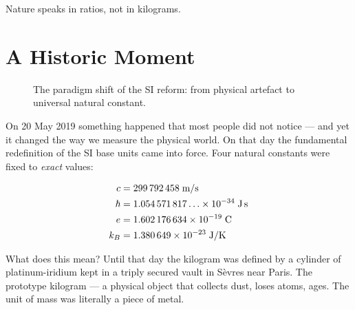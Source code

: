 \epigraph{Nature speaks in ratios, not in kilograms.}{}

\section{A Historic Moment}


\begin{figure}[ht]
\centering
{}
\caption{The paradigm shift of the SI reform: from physical artefact to universal natural constant.}
\label{fig:si_reform}
\end{figure}
On 20 May 2019 something happened that most people did not notice --- and yet it changed the way we measure the physical world. On that day the fundamental redefinition of the SI base units came into force. Four natural constants were fixed to \emph{exact} values:

\begin{align}
c &= 299\,792\,458 \;\text{m/s} \label{eq:c}\\
\hbar &= 1.054\,571\,817\ldots \times 10^{-34} \;\text{J\,s} \label{eq:hbar}\\
e &= 1.602\,176\,634 \times 10^{-19} \;\text{C} \label{eq:e}\\
k_B &= 1.380\,649 \times 10^{-23} \;\text{J/K} \label{eq:kb}
\end{align}

What does this mean? Until that day the kilogram was defined by a cylinder of platinum-iridium kept in a triply secured vault in Sèvres near Paris. The prototype kilogram --- a physical object that collects dust, loses atoms, ages. The unit of mass was literally a piece of metal.

